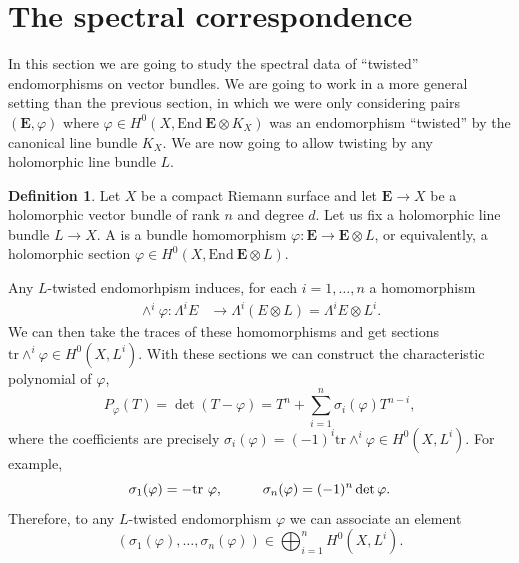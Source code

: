\documentclass[12pt,a4paper]{book}
\theoremstyle{definition} \newtheorem{defn}[thm]{Definition}
\theoremstyle{definition} \newtheorem{ejemplo}[thm]{Example}
\theoremstyle{remark} \newtheorem{rem}[thm]{Remark}
\def\tr{\mathrm{tr}}
\def\End{\mathrm{End}}
\newcommand{\ve}[1]{\mathbf{#1}}
\let\emph\relax
\begin{document}
    \section{The spectral correspondence}
    In this section we are going to study the spectral data of ``twisted'' endomorphisms on vector bundles. We are going to work in a more general setting than the previous section, in which we were only considering pairs $(\ve{E},\varphi)$ where $\varphi\in H^0(X,\End\ \ve{E} \otimes K_X)$ was an endomorphism ``twisted'' by the canonical line bundle $K_X$. We are now going to allow twisting by any holomorphic line bundle $L$.

    \begin{defn}
      Let $X$ be a compact Riemann surface and let $\ve{E}\rightarrow X$ be a holomorphic vector bundle of rank $n$ and degree $d$. Let us fix a holomorphic line bundle $L\rightarrow X$. A \emph{$L$-twisted endomorphism} is a bundle homomorphism $\varphi:\ve{E}\rightarrow \ve{E}\otimes L$, or equivalently, a holomorphic section $\varphi \in H^0(X,\End\ \ve{E} \otimes L)$.
    \end{defn}

    Any $L$-twisted endomorhpism induces, for each $i=1,\dots,n$ a homomorphism
    \begin{align*}
      \wedge^i\varphi : \Lambda^i E&\longrightarrow \Lambda^i(E\otimes L)= \Lambda^i E \otimes L^{i}.
      \end{align*}
      We can then take the traces of these homomorphisms and get sections $\tr \wedge^i \varphi \in H^0(X,L^{i})$. With these sections we can construct the characteristic polynomial of $\varphi$, 
      \begin{equation*}
	P_\varphi(T)=\det(T-\varphi)=T^n+\sum_{i=1}^n \sigma_i(\varphi) T^{n-i},
      \end{equation*}
      where the coefficients are precisely $\sigma_i(\varphi)=(-1)^i\tr \wedge^i \varphi \in H^0(X,L^{i})$. For example, $$\sigma_1(\varphi)=-\tr\ \varphi, \hspace{1 cm} \sigma_n(\varphi)=(-1)^n \det \varphi.$$
      Therefore, to any $L$-twisted endomorphism $\varphi$ we can associate an element 
      \begin{equation*}
	(\sigma_1(\varphi),\dots,\sigma_n(\varphi)) \in \bigoplus_{i=1}^n H^0(X,L^i).
      \end{equation*}
\end{document}

